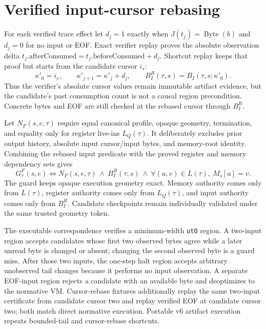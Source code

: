 \documentclass{article}
\begin{document}
\section{Verified input-cursor rebasing}

For each verified trace effect let $d_j=1$ exactly when
$J(t_j)=\operatorname{Byte}(b)$ and $d_j=0$ for no input or EOF. Exact verifier
replay proves the absolute observation delta
$t_j.\mathrm{afterConsumed}=t_j.\mathrm{beforeConsumed}+d_j$. Shortcut replay
keeps that proof but starts from the candidate cursor $i_s$:
\begin{equation}
  \kappa'_0=i_s,\qquad
  \kappa'_{j+1}=\kappa'_j+d_j,\qquad
  B_I^R(\tau,s)=B_I(\tau,s;\kappa'_0).
  \label{eq:state-graph-region-input-cursor-rebase}
\end{equation}
Thus the verifier's absolute cursor values remain immutable artifact evidence,
but the candidate's past consumption count is not a causal region precondition.
Concrete bytes and EOF are still checked at the rebased cursor through
$B_I^R$.

Let $N_F(s,e,\tau)$ require equal canonical profile, opaque geometry,
termination, and equality only for register live-ins $L_Q(\tau)$. It
deliberately excludes prior output history, absolute input cursor/input bytes,
and memory-root identity. Combining the rebased input predicate with the proved
register and memory dependency sets gives
\begin{equation}
  G^F_{\tau}(s,e)
  \Longleftrightarrow
  N_F(s,e,\tau)\ \land\ B_I^R(\tau,s)\ \land\
  \forall(a,v)\in L(\tau),\ M_s[a]=v.
  \label{eq:state-graph-region-consumed-input-guard}
\end{equation}
The guard keeps opaque execution geometry exact. Memory authority comes only
from $L(\tau)$, register authority comes only from $L_Q(\tau)$, and input
authority comes only from $B_I^R$. Candidate checkpoints remain individually
validated under the same trusted geometry token.

The executable correspondence verifies a minimum-width \texttt{utO} region.
A two-input region accepts candidates whose first two observed bytes agree while
a later unread byte is changed or absent; changing the second observed byte is a
guard miss. After those two inputs, the one-step halt region accepts arbitrary
unobserved tail changes because it performs no input observation. A separate
EOF-input region rejects a candidate with an available byte and deoptimizes to
the normative VM. Cursor-rebase fixtures additionally replay the same two-input
certificate from candidate cursor two and replay verified EOF at candidate
cursor two; both match direct normative execution. Portable v6 artifact
execution repeats bounded-tail and cursor-rebase shortcuts.
\end{document}
